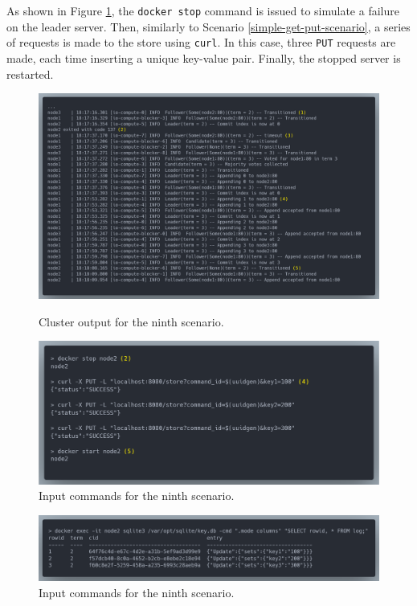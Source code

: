 As shown in Figure \ref{fig:scenario-9-commands}, the \lstinline|docker stop| command is issued to simulate a failure on the leader server. Then, similarly to Scenario \ref{simple-get-put-scenario}, a series of requests is made to the store using \lstinline|curl|. In this case, three \lstinline|PUT| requests are made, each time inserting a unique key-value pair. Finally, the stopped server is restarted.

\begin{figure}[!ht]
\centering
\includegraphics[width=500pt]{images/scenario_9_cluster.png}
\caption{Cluster output for the ninth scenario.}
\label{fig:scenario-9-cluster}
\includegraphics[width=500pt]{images/scenario_9_commands.png}
\caption{Input commands for the ninth scenario.}
\label{fig:scenario-9-commands}
\end{figure}

\begin{figure}[!ht]
\centering
\includegraphics[width=500pt]{images/scenario_9_sqlite.png}
\caption{Input commands for the ninth scenario.}
\label{fig:scenario-9-sqlite}
\end{figure}

